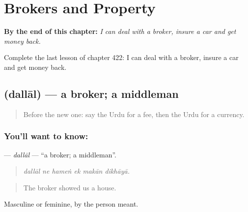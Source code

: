 
\chapter{Brokers and Property}
\label{ch:ur-brokers-and-property}

\begin{chapteropening}
\textbf{By the end of this chapter:} \emph{I can deal with a broker, insure a car and get money back.}

Complete the last lesson of chapter 422: I can deal with a broker, insure a car and get money back.
\end{chapteropening}

\section[\texorpdfstring{\ur{دلال} (dallāl)}{دلال (dallāl)}]{ (dallāl) — a broker; a middleman}

\label{lesson:UR-C422-dallal}



\begin{quote}
Before the new one: say the Urdu for a fee, then the Urdu for a currency.
\end{quote}

\subsection*{You'll want to know: }
\textbf{} — \emph{dallāl} — \textquotedblleft{}a broker; a middleman\textquotedblright{}.

\begin{quote}
     
\end{quote}

\begin{quote}
\emph{dallāl ne hameṅ ek makān dikhāyā.}
\end{quote}

\begin{quote}
The broker showed us a house.
\end{quote}

Masculine or feminine, by the person meant.

